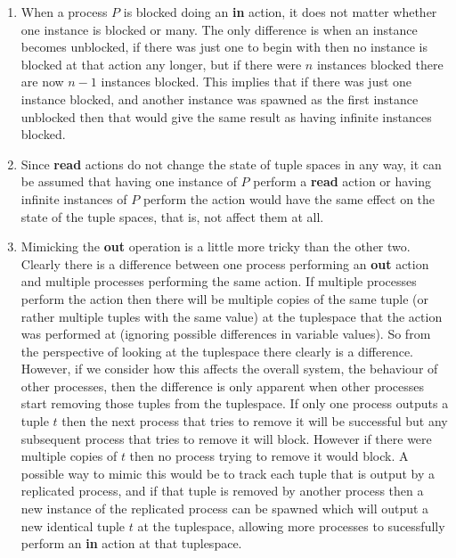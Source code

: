 	\begin{enumerate}
		\item When a process $P$ is blocked doing an \textbf{in} action, it does 
		not matter whether one instance is blocked or many. The only difference is 
		when an instance becomes unblocked, if there was just one to begin with 
		then no instance is blocked at that action any longer, but if there were 
		$n$ instances blocked there are now $n-1$ instances blocked. This implies
		that if there was just one instance blocked, and another instance was 
		spawned as the first instance unblocked then that would give the same 
		result as having infinite instances blocked. 
	
		\item Since \textbf{read} actions do not change the state of tuple spaces
		in any way, it can be assumed that having one instance of $P$ perform a
		\textbf {read} action or having infinite instances of $P$ perform the 
		action would have the same effect on the state of the tuple spaces, that 
		is, not affect them at all. 
		
		\item Mimicking the \textbf{out} operation is a little more tricky than 
		the other two. Clearly there is a difference between one process 
		performing an \textbf{out} action and multiple processes performing the 
		same action. If multiple processes perform the action then there will be 
		multiple copies of the same tuple (or rather multiple tuples with the same 
		value) at the tuplespace that the action was performed at (ignoring 
		possible differences in variable values). So from the perspective of 
		looking at the tuplespace there clearly is a difference. However, if we 
		consider how this affects the overall system, the behaviour of other 
		processes, then the difference is only apparent when other processes start 
		removing those tuples from the tuplespace. If only one process outputs a 
		tuple $t$ then the next process that tries to remove it will be successful 
		but any subsequent process that tries to remove it will block. However if 
		there were multiple copies of $t$ then no process trying to remove it 
		would block. A possible way to mimic this would be to track each tuple 
		that is output by a replicated process, and if that tuple is removed by 
		another process then a new instance of the replicated process can be 
		spawned which will output a new identical tuple $t$ at the tuplespace, 
		allowing more processes to sucessfully perform an \textbf{in} action at 
		that tuplespace.
	\end{enumerate}
		
